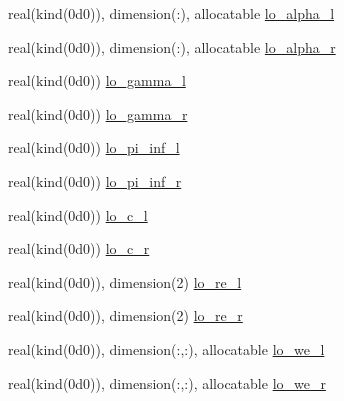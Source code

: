 \begin{Indent}
\begin{DoxyCompactItemize}
\item 
real(kind(0d0)), dimension(\+:), allocatable \hyperlink{namespacem__riemann__solvers_a57eb3b7013680ab3c30a1e8f049a0402}{lo\+\_\+alpha\+\_\+l}
\item 
real(kind(0d0)), dimension(\+:), allocatable \hyperlink{namespacem__riemann__solvers_a89059f36a5b3db54b3bd35cc3215a4be}{lo\+\_\+alpha\+\_\+r}
\item 
real(kind(0d0)) \hyperlink{namespacem__riemann__solvers_aa0a0c169528cc9c4a379f641fb653712}{lo\+\_\+gamma\+\_\+l}
\item 
real(kind(0d0)) \hyperlink{namespacem__riemann__solvers_a48b0505675e2bd1d0b36bda9de508655}{lo\+\_\+gamma\+\_\+r}
\item 
real(kind(0d0)) \hyperlink{namespacem__riemann__solvers_a1cfaf511a3605cef96d95b88de661071}{lo\+\_\+pi\+\_\+inf\+\_\+l}
\item 
real(kind(0d0)) \hyperlink{namespacem__riemann__solvers_a5e682fb9d377f50935dfbe4d5dd67120}{lo\+\_\+pi\+\_\+inf\+\_\+r}
\item 
real(kind(0d0)) \hyperlink{namespacem__riemann__solvers_af060aa45ac1c0c96428fd428ca3f63af}{lo\+\_\+c\+\_\+l}
\item 
real(kind(0d0)) \hyperlink{namespacem__riemann__solvers_ad056500eedb3761b13485edb94ec773e}{lo\+\_\+c\+\_\+r}
\item 
real(kind(0d0)), dimension(2) \hyperlink{namespacem__riemann__solvers_abbde404883793a9aae3708896b4a2781}{lo\+\_\+re\+\_\+l}
\item 
real(kind(0d0)), dimension(2) \hyperlink{namespacem__riemann__solvers_a6d89cb45833bdcb48f3f1b01badaedcf}{lo\+\_\+re\+\_\+r}
\item 
real(kind(0d0)), dimension(\+:,\+:), allocatable \hyperlink{namespacem__riemann__solvers_a8388f446036552682910bbe06da81f70}{lo\+\_\+we\+\_\+l}
\item 
real(kind(0d0)), dimension(\+:,\+:), allocatable \hyperlink{namespacem__riemann__solvers_a7883028b185740c1d507b486eceef969}{lo\+\_\+we\+\_\+r}
\end{DoxyCompactItemize}
\end{Indent}

